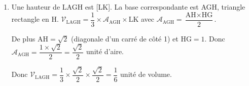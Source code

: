 \begin{enumerate}
\begin{enumerate}
$\text{LK} = \left\|\vect{\text{LK}}\right\| = \sqrt{0^2+\left(-\dfrac12\right)^2+\left(\dfrac12\right)^2}=\sqrt{\dfrac12}=\dfrac{\sqrt2}{2}$  unité de longueur.
			\item Une hauteur de LAGH est [LK]. La base correspondante est AGH, triangle rectangle en H.  $\mathcal{V}_{\text{LAGH}}=\dfrac13\times \mathcal{A}_{\text{AGH}}\times \text{LK}$ avec $\mathcal{A}_{\text{AGH}}=\dfrac{\text{AH}\times \text{HG}}{2}$.

De plus $\text{AH} =\sqrt{2}$ (diagonale d'un carré de côté 1) et $\text{HG} =1$. Donc $\mathcal{A}_{\text{AGH}}=\dfrac{1 \times \sqrt{2}}{2}=\dfrac{\sqrt2}{2}$ unité d'aire.

Donc $\mathcal{V}_{\text{LAGH}}=\dfrac13\times \dfrac{\sqrt2}{2}\times \dfrac{\sqrt2}{2}=\dfrac{1}{6}$ unité de volume.
		\end{enumerate}
\end{enumerate}

\bigskip
